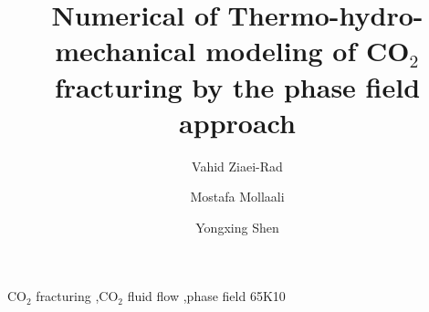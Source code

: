 \documentclass{elsarticle}
\begin{document}
\begin{frontmatter}

\title{Numerical of Thermo-hydro- mechanical modeling of CO$_2$ fracturing by the phase field approach}


\author[mymainaddress]{Vahid Ziaei-Rad}
\author[mysecondaryaddress]{Mostafa Mollaali}



\author[mysecondaryaddress]{Yongxing Shen}

\address[mymainaddress]{Department of Civil Engineering, Isfahan University of Technology, Isfahan 84156-83111, Iran}
\address[mysecondaryaddress]{University of Michigan -- Shanghai Jiao Tong University Joint Institute, Shanghai Jiao Tong University,	Shanghai, China}

\begin{abstract}

\end{abstract}

\begin{keyword}
CO$_2$ fracturing \sep  CO$_2$ fluid flow \sep  phase field
\MSC[2010] 65K10
\end{keyword}

\end{frontmatter}

\linenumbers




%


%
%
%
%
\clearpage
\appendix
%

\end{document}
